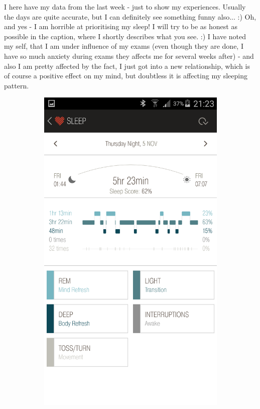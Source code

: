 \documentclass[12pt,a4paper]{article}
\begin{document}
%

I here have my data from the last week - just to show my experiences. Usually the days are quite accurate, but I can definitely see something funny also... :) Oh, and yes - I am horrible at prioritising my sleep! I will try to be as honest as possible in the caption, where I shortly describes what you see. :) I have noted my self, that I am under influence of my exams (even though they are done, I have so much anxiety during exams they affects me for several weeks after) - and also I am pretty affected by the fact, I just got into a new relationship, which is of course a positive effect on my mind, but doubtless it is affecting my sleeping pattern. 

\begin{figure}[H]
    \begin{subfigure}[b]{0.5\textwidth}
        \includegraphics[width=\textwidth]{05-11-15.png}

\end{subfigure}
\end{figure}
\end{document}
